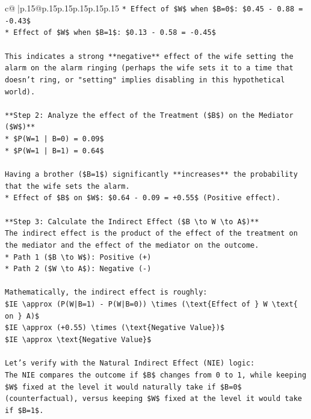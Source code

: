 \documentclass{article}
\begin{document}
{\begin{supertabular}{c@{$\;$}|p{.15\linewidth}@{}p{.15\linewidth}p{.15\linewidth}p{.15\linewidth}p{.15\linewidth}p{.15\linewidth}}
{{{\texttt{*   Effect of \$W\$ when \$B=0\$: \$0.45 {-} 0.88 = {-}0.43\$} \\
\texttt{*   Effect of \$W\$ when \$B=1\$: \$0.13 {-} 0.58 = {-}0.45\$} \\
\\ 
\texttt{This indicates a strong **negative** effect of the wife setting the alarm on the alarm ringing (perhaps the wife sets it to a time that doesn't ring, or "setting" implies disabling in this hypothetical world).} \\
\\ 
\texttt{**Step 2: Analyze the effect of the Treatment (\$B\$) on the Mediator (\$W\$)**} \\
\texttt{*   \$P(W=1 | B=0) = 0.09\$} \\
\texttt{*   \$P(W=1 | B=1) = 0.64\$} \\
\\ 
\texttt{Having a brother (\$B=1\$) significantly **increases** the probability that the wife sets the alarm.} \\
\texttt{*   Effect of \$B\$ on \$W\$: \$0.64 {-} 0.09 = +0.55\$ (Positive effect).} \\
\\ 
\texttt{**Step 3: Calculate the Indirect Effect (\$B \textbackslash{}to W \textbackslash{}to A\$)**} \\
\texttt{The indirect effect is the product of the effect of the treatment on the mediator and the effect of the mediator on the outcome.} \\
\texttt{*   Path 1 (\$B \textbackslash{}to W\$): Positive (+)} \\
\texttt{*   Path 2 (\$W \textbackslash{}to A\$): Negative ({-})} \\
\\ 
\texttt{Mathematically, the indirect effect is roughly:} \\
\texttt{\$IE \textbackslash{}approx (P(W|B=1) {-} P(W|B=0)) \textbackslash{}times (\textbackslash{}text\{Effect of \} W \textbackslash{}text\{ on \} A)\$} \\
\texttt{\$IE \textbackslash{}approx (+0.55) \textbackslash{}times (\textbackslash{}text\{Negative Value\})\$} \\
\texttt{\$IE \textbackslash{}approx \textbackslash{}text\{Negative Value\}\$} \\
\\ 
\texttt{Let's verify with the Natural Indirect Effect (NIE) logic:} \\
\texttt{The NIE compares the outcome if \$B\$ changes from 0 to 1, while keeping \$W\$ fixed at the level it would naturally take if \$B=0\$ (counterfactual), versus keeping \$W\$ fixed at the level it would take if \$B=1\$.} \\
}}}
\end{supertabular}}
\end{document}
